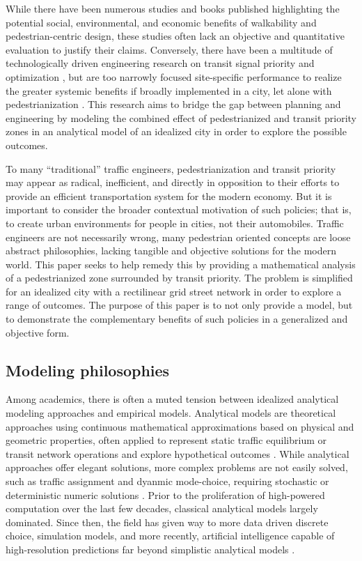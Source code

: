 \documentclass{elsarticle}\usepackage[]{graphicx}\usepackage[]{color}
\begin{document}
While there have been numerous studies and books published highlighting the potential social, environmental, and economic benefits of walkability and pedestrian-centric design, these studies often lack an objective and quantitative evaluation to justify their claims. Conversely, there have been a multitude of technologically driven engineering research on transit signal priority \cite{Skabardonis2000,Dion2002,Dion2004} and optimization \cite{Stevanovic2008,Mesbah2011,Ma2013}, but are too narrowly focused site-specific performance to realize the greater systemic benefits if broadly implemented in a city, let alone with pedestrianization \citep{Mesbah2008,Sanchez2008,Wang2012}. This research aims to bridge the gap between planning and engineering by modeling the combined effect of pedestrianized and transit priority zones in an analytical model of an idealized city in order to explore the possible outcomes. 

To many ``traditional'' traffic engineers, pedestrianization and transit priority may appear as radical, inefficient, and directly in opposition to their efforts to provide an efficient transportation system for the modern economy. But it is important to consider the broader contextual motivation of such policies; that is, to create urban environments for people in cities, not their automobiles. Traffic engineers are not necessarily wrong, many pedestrian oriented concepts are loose abstract philosophies, lacking tangible and objective solutions for the modern world. This paper seeks to help remedy this by providing a mathematical analysis of a pedestrianized zone surrounded by transit priority. The problem is simplified for an idealized city with a rectilinear grid street network in order to explore a range of outcomes. The purpose of this paper is to not only provide a model, but to demonstrate the complementary benefits of such policies in a generalized and objective form.

\subsection{Modeling philosophies}
Among academics, there is often a muted tension between idealized analytical modeling approaches and empirical models. Analytical models are theoretical approaches using continuous mathematical approximations based on physical and geometric properties, often applied to represent static traffic equilibrium or transit network operations and explore hypothetical outcomes \citep{Newell1973,Badia2017,Badia2014,Chen2015,Daganzo2010,Holroyd1967,Sivakumaran2012,Vaughan1987}. While analytical approaches offer elegant solutions, more complex problems are not easily solved, such as traffic assignment and dyanmic mode-choice, requiring stochastic or deterministic numeric solutions \citep{Dial1996,Watling2006,Chen2010,DePalma1983,Daganzo1977}. Prior to the proliferation of high-powered computation over the last few decades, classical analytical models largely dominated. Since then, the field has given way to more data driven discrete choice, simulation models, and more recently, artificial intelligence capable of high-resolution predictions far beyond simplistic analytical models \citep{Ben-Akiva1981,Ben-Akiva1985,Ben-Akiva1986,McFadden1981,Train1978,Ziemke2016}. 
\end{document}
